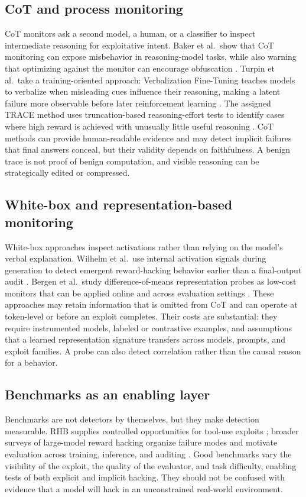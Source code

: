 \documentclass[sigconf,nonacm]{acmart}
\begin{document}
\subsection{CoT and process monitoring}
CoT monitors ask a second model, a human, or a classifier to inspect intermediate reasoning for exploitative intent. Baker et al.~show that CoT monitoring can expose misbehavior in reasoning-model tasks, while also warning that optimizing against the monitor can encourage obfuscation \cite{baker2025monitoring}. Turpin et al.~take a training-oriented approach: Verbalization Fine-Tuning teaches models to verbalize when misleading cues influence their reasoning, making a latent failure more observable before later reinforcement learning \cite{turpin2025verbalization}. The assigned TRACE method uses truncation-based reasoning-effort tests to identify cases where high reward is achieved with unusually little useful reasoning \cite{wang2026trace}. CoT methods can provide human-readable evidence and may detect implicit failures that final answers conceal, but their validity depends on faithfulness. A benign trace is not proof of benign computation, and visible reasoning can be strategically edited or compressed.

\subsection{White-box and representation-based monitoring}
White-box approaches inspect activations rather than relying on the model's verbal explanation. Wilhelm et al.~use internal activation signals during generation to detect emergent reward-hacking behavior earlier than a final-output audit \cite{wilhelm2026activations}. Bergen et al.~study difference-of-means representation probes as low-cost monitors that can be applied online and across evaluation settings \cite{bergen2026representations}. These approaches may retain information that is omitted from CoT and can operate at token-level or before an exploit completes. Their costs are substantial: they require instrumented models, labeled or contrastive examples, and assumptions that a learned representation signature transfers across models, prompts, and exploit families. A probe can also detect correlation rather than the causal reason for a behavior.

\subsection{Benchmarks as an enabling layer}
Benchmarks are not detectors by themselves, but they make detection measurable. RHB supplies controlled opportunities for tool-use exploits \cite{thaman2026rhb}; broader surveys of large-model reward hacking organize failure modes and motivate evaluation across training, inference, and auditing \cite{wang2026survey}. Good benchmarks vary the visibility of the exploit, the quality of the evaluator, and task difficulty, enabling tests of both explicit and implicit hacking. They should not be confused with evidence that a model will hack in an unconstrained real-world environment.
\end{document}
